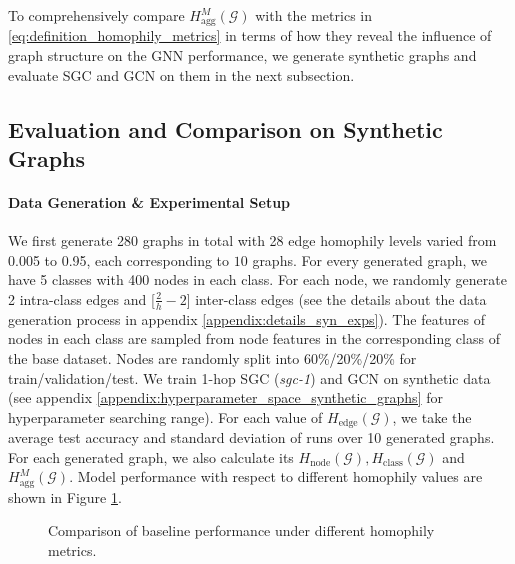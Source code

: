 \documentclass{article}
\newcommand{\0}{{\boldsymbol{0}}}
\newcommand{\6}{{\partial}}
\newcommand{\8}{{\infty}}
\newcommand{\4}{{\nabla}}
\begin{document}
To comprehensively compare $H_{\text{agg}}^M(\mathcal{G})$ with the metrics in \eqref{eq:definition_homophily_metrics} in terms of how they reveal the influence of graph structure on the GNN performance, we generate synthetic graphs and evaluate SGC \cite{wu2019simplifying} and GCN \cite{kipf2016classification} on them in the next subsection.



\subsection{Evaluation and Comparison on Synthetic Graphs}
\paragraph{Data Generation \& Experimental Setup}
We first generate 280 graphs in total with 28 edge homophily levels varied from 0.005 to 0.95, each corresponding to $10$ graphs. For every generated graph, we have 5 classes with 400 nodes in each class. For each node, we randomly generate 2 intra-class edges and [$\frac{2}{h} -2$] inter-class edges (see the details about the data generation process in appendix \ref{appendix:details_syn_exps}). The features of nodes in each class are sampled from node features in the corresponding class of the base dataset. Nodes are randomly split into 60\%/20\%/20\% for train/validation/test. We train 1-hop SGC (\textit{sgc-1}) \cite{wu2019simplifying} and GCN \cite{kipf2016classification} on synthetic data  (see appendix \ref{appendix:hyperparameter_space_synthetic_graphs} for hyperparameter searching range). For each value of $H_\text{edge}(\mathcal{G})$, we take the average test accuracy and standard deviation of runs over 10 generated graphs. For each generated graph, we also calculate its $H_{\text{node}}(\mathcal{G}), H_{\text{class}}(\mathcal{G})$ and $H_{\text{agg}}^M(\mathcal{G})$. Model performance with respect to different homophily values are shown in Figure \ref{fig:comparison_homophily_metrics}.
\begin{figure}[h]
     {
     }
     \caption{Comparison of baseline performance under different homophily metrics.}
     \label{fig:comparison_homophily_metrics}
\end{figure}
\end{document}

